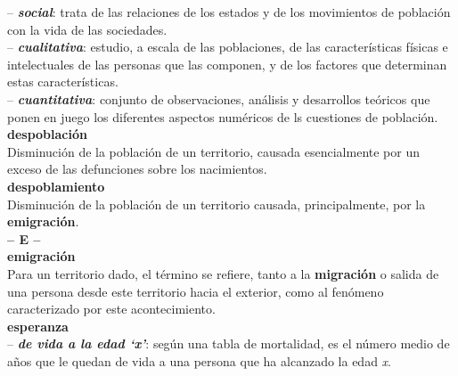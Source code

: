 \begin{multicols}{2}
\vspace{-0.3cm}
-- \textbf{\textit{social}}: trata de las relaciones de los estados y de los movimientos de poblaci\'on con la vida de las sociedades.\\

\vspace{-0.3cm}
-- \textbf{\textit{cualitativa}}: estudio, a escala de las poblaciones, de las caracter\'isticas f\'isicas e intelectuales de las personas que las componen, y de los factores que determinan estas caracter\'isticas.\\

\vspace{-0.3cm}
-- \textbf{\textit{cuantitativa}}: conjunto de observaciones, an\'alisis y desarrollos te\'oricos que ponen en juego los diferentes aspectos num\'ericos de ls cuestiones de poblaci\'on.\\

\noindent \textbf{\Large{despoblación}}\\

\vspace{-0.3cm}
Disminución de la población de un territorio, causada esencialmente por un exceso de las defunciones sobre los nacimientos.\\

\noindent \textbf{\Large{despoblamiento}}\\

\vspace{-0.3cm}
Disminución de la población de un territorio causada, principalmente, por la \textbf{emigración}.\\

\noindent\textbf{\huge{-- E --}}\\

\noindent \textbf{\Large{emigraci\'on}}\\

\vspace{-0.3cm}
Para un territorio dado, el t\'ermino se refiere, tanto a la \textbf{migraci\'on} o salida de una persona desde este territorio hacia el exterior, como al fen\'omeno caracterizado por este acontecimiento.\\

\noindent \textbf{\Large{esperanza}}\\

\vspace{-0.3cm}
--  \textbf{\textit{de vida a la edad `x'}}: según una tabla de mortalidad, es el número medio de años que le quedan de vida a una persona que ha alcanzado la edad \textit{x}.\\


\end{multicols}
